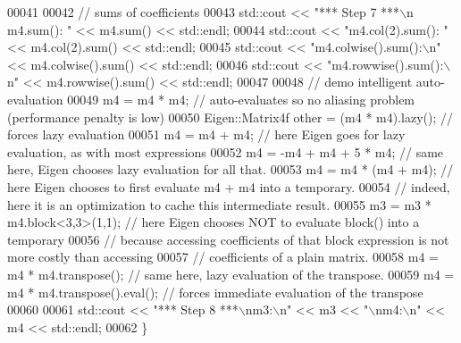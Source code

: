 \begin{DoxyCode}
00041 
00042   \textcolor{comment}{// sums of coefficients}
00043   std::cout << \textcolor{stringliteral}{"*** Step 7 ***\(\backslash\)n m4.sum(): "} << m4.sum() << std::endl;
00044   std::cout << \textcolor{stringliteral}{"m4.col(2).sum(): "} << m4.col(2).sum() << std::endl;
00045   std::cout << \textcolor{stringliteral}{"m4.colwise().sum():\(\backslash\)n"} << m4.colwise().sum() << std::endl;
00046   std::cout << \textcolor{stringliteral}{"m4.rowwise().sum():\(\backslash\)n"} << m4.rowwise().sum() << std::endl;
00047 
00048   \textcolor{comment}{// demo intelligent auto-evaluation}
00049   m4 = m4 * m4; \textcolor{comment}{// auto-evaluates so no aliasing problem (performance penalty is low)}
00050   Eigen::Matrix4f other = (m4 * m4).lazy(); \textcolor{comment}{// forces lazy evaluation}
00051   m4 = m4 + m4; \textcolor{comment}{// here Eigen goes for lazy evaluation, as with most expressions}
00052   m4 = -m4 + m4 + 5 * m4; \textcolor{comment}{// same here, Eigen chooses lazy evaluation for all that.}
00053   m4 = m4 * (m4 + m4); \textcolor{comment}{// here Eigen chooses to first evaluate m4 + m4 into a temporary.}
00054                        \textcolor{comment}{// indeed, here it is an optimization to cache this intermediate result.}
00055   m3 = m3 * m4.block<3,3>(1,1); \textcolor{comment}{// here Eigen chooses NOT to evaluate block() into a temporary}
00056     \textcolor{comment}{// because accessing coefficients of that block expression is not more costly than accessing}
00057     \textcolor{comment}{// coefficients of a plain matrix.}
00058   m4 = m4 * m4.transpose(); \textcolor{comment}{// same here, lazy evaluation of the transpose.}
00059   m4 = m4 * m4.transpose().eval(); \textcolor{comment}{// forces immediate evaluation of the transpose}
00060 
00061   std::cout << \textcolor{stringliteral}{"*** Step 8 ***\(\backslash\)nm3:\(\backslash\)n"} << m3 << \textcolor{stringliteral}{"\(\backslash\)nm4:\(\backslash\)n"} << m4 << std::endl;
00062 \}
\end{DoxyCode}
